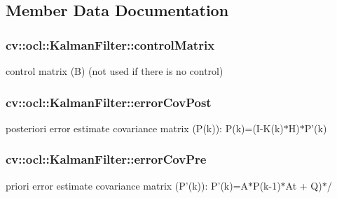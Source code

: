 \subsection{Member Data Documentation}
\hypertarget{classcv_1_1ocl_1_1KalmanFilter_a99831c353c2aacc9d9ff3c9ae58f669a}{
\subsubsection[{control\-Matrix}]{ cv\-::ocl\-::\-Kalman\-Filter\-::control\-Matrix}}\label{classcv_1_1ocl_1_1KalmanFilter_a99831c353c2aacc9d9ff3c9ae58f669a}


control matrix (B) (not used if there is no control) 

\hypertarget{classcv_1_1ocl_1_1KalmanFilter_af6415a482e0905ee321a13c65865ec0b}{
\subsubsection[{error\-Cov\-Post}]{ cv\-::ocl\-::\-Kalman\-Filter\-::error\-Cov\-Post}}\label{classcv_1_1ocl_1_1KalmanFilter_af6415a482e0905ee321a13c65865ec0b}


posteriori error estimate covariance matrix (P(k))\-: P(k)=(I-\/\-K(k)$\ast$\-H)$\ast$\-P'(k) 

\hypertarget{classcv_1_1ocl_1_1KalmanFilter_a5079ae8f4c64f5a27ad65455d8b526c7}{
\subsubsection[{error\-Cov\-Pre}]{ cv\-::ocl\-::\-Kalman\-Filter\-::error\-Cov\-Pre}}\label{classcv_1_1ocl_1_1KalmanFilter_a5079ae8f4c64f5a27ad65455d8b526c7}


priori error estimate covariance matrix (P'(k))\-: P'(k)=A$\ast$\-P(k-\/1)$\ast$\-At + Q)$\ast$/ 

